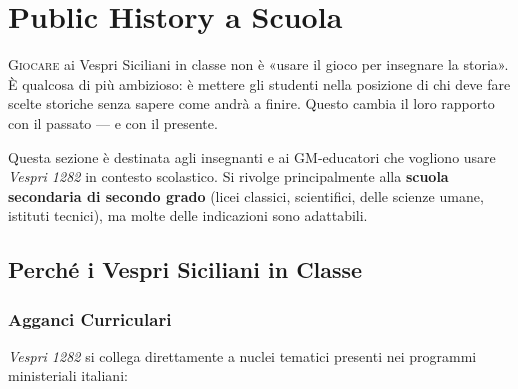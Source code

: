 
\chapter{Public History a Scuola}

\lettrine[lines=3]{G}{iocare} ai Vespri Siciliani in classe non è
«usare il gioco per insegnare la storia». È qualcosa di più ambizioso:
è mettere gli studenti nella posizione di chi deve fare scelte storiche
senza sapere come andrà a finire. Questo cambia il loro rapporto
con il passato — e con il presente.

Questa sezione è destinata agli insegnanti e ai GM-educatori che
vogliono usare \textit{Vespri 1282} in contesto scolastico. Si
rivolge principalmente alla \textbf{scuola secondaria di secondo
grado} (licei classici, scientifici, delle scienze umane, istituti
tecnici), ma molte delle indicazioni sono adattabili.


\secsep

\section{Perché i Vespri Siciliani in Classe}

\subsection{Agganci Curriculari}

\textit{Vespri 1282} si collega direttamente a nuclei tematici
presenti nei programmi ministeriali italiani:

